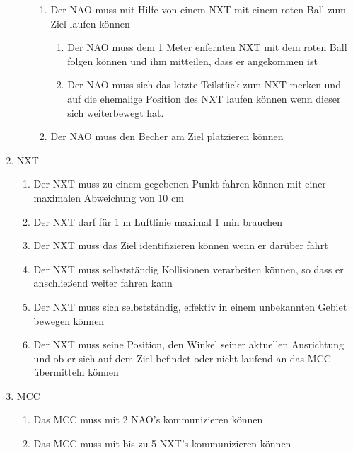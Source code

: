 \begin{enumerate}
\begin{enumerate}
\begin{enumerate}
       		\item Der NAO muss mit Hilfe von einem NXT mit einem roten Ball zum Ziel laufen können
        	\begin{enumerate}
            	\item Der NAO muss dem 1 Meter enfernten NXT mit dem roten Ball folgen können und ihm mitteilen, dass er angekommen ist

            	\item Der NAO muss sich das letzte Teilstück zum NXT merken und auf die ehemalige Position des NXT laufen können wenn dieser sich weiterbewegt hat.
        	\end{enumerate}
        	\item Der NAO muss den Becher am Ziel platzieren können
		\end{enumerate}
    \end{enumerate}
    \item NXT
    \begin{enumerate}
        \item Der NXT muss zu einem gegebenen Punkt fahren können mit einer maximalen Abweichung von 10 cm

        \item Der NXT darf für 1 m Luftlinie maximal 1 min brauchen

        \item Der NXT muss das Ziel identifizieren können wenn er darüber fährt

        \item Der NXT muss selbstständig Kollisionen verarbeiten können, so dass er anschließend weiter fahren kann

        \item Der NXT muss sich selbstständig, effektiv in einem unbekannten Gebiet bewegen können
        
        \item Der NXT muss seine Position, den Winkel seiner aktuellen Ausrichtung und ob er sich auf dem Ziel befindet oder nicht laufend an das MCC übermitteln können


    \end{enumerate}
    \item MCC
    \begin{enumerate}
        \item Das MCC muss mit 2 NAO's kommunizieren können

        \item Das MCC muss mit bis zu 5 NXT's kommunizieren können
        

\end{enumerate}
\end{enumerate}
